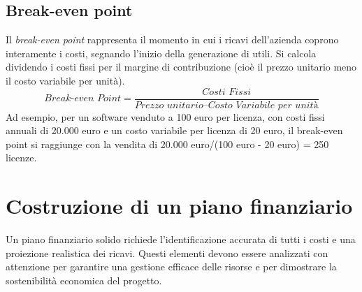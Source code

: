 \subsection{Break-even point}
Il \textit{break-even point} rappresenta il momento in cui i ricavi dell’azienda coprono interamente i costi, segnando l’inizio della generazione di utili. Si calcola dividendo i costi fissi per il margine di contribuzione (cioè il prezzo unitario meno il costo variabile per unità). 
\begin{equation*}
    \textit{Break-even Point} = \frac{\textit{Costi Fissi}}{\textit{Prezzo unitario} – \textit{Costo Variabile per unità}}
\end{equation*}
Ad esempio, per un software venduto a 100 euro per licenza, con costi fissi annuali di 20.000 euro e un costo variabile per licenza di 20 euro, il break-even point si raggiunge con la vendita di 20.000 euro/(100 euro - 20 euro) = 250 licenze.

\section{Costruzione di un piano finanziario}
Un piano finanziario solido richiede l’identificazione accurata di tutti i costi e una proiezione realistica dei ricavi. Questi elementi devono essere analizzati con attenzione per garantire una gestione efficace delle risorse e per dimostrare la sostenibilità economica del progetto.

